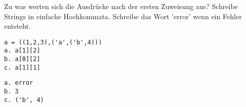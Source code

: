 \question[3]
Zu was werten sich die Ausdrücke nach der ersten Zuweisung aus?
Schreibe Strings in einfache Hochkommata. Schreibe das Wort 'error' wenn ein Fehler
entsteht.
\begin{lstlisting}
a = ((1,2,3),('a',('b',4)))
a. a[1][2]
b. a[0][2]
c. a[1][1]
\end{lstlisting}
\begin{solutionbox}{5cm}
\begin{lstlisting}
a. error
b. 3
c. ('b', 4)
\end{lstlisting}
\end{solutionbox}
